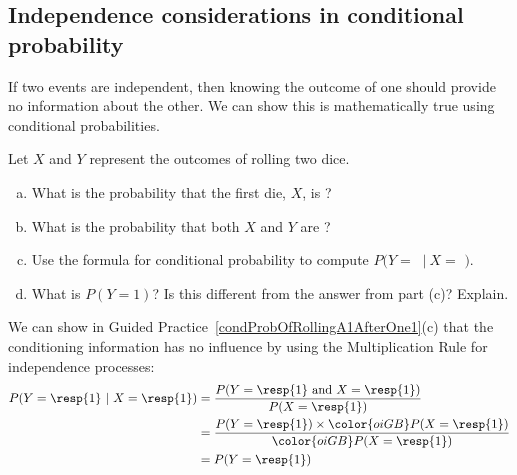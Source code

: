 
\subsection{Independence considerations in conditional probability}

If two events are independent, then knowing the outcome of one should provide no information about the other. We can show this is mathematically true using conditional probabilities.

\begin{exercisewrap}
\begin{nexercise} \label{condProbOfRollingA1AfterOne1}
Let $X$ and $Y$ represent the outcomes of rolling two dice.\footnotemark
\begin{enumerate}[(a)]
\setlength{\itemsep}{0mm}
\item What is the probability that the first die, $X$, is ?
\item What is the probability that both $X$ and $Y$ are ?
\item Use the formula for conditional probability to compute $P(Y =$ $\ |\ X = $ $)$.
\item What is $P(Y=1)$? Is this different from the answer from part (c)? Explain.
\end{enumerate}
\end{nexercise}
\end{exercisewrap}

We can show in Guided Practice~\ref{condProbOfRollingA1AfterOne1}(c) that the conditioning information has no influence by using the Multiplication Rule for independence processes:
\begin{align*}
P(Y=\text{\resp{1}}\ |\ X=\text{\resp{1}})
    &= \frac{P(Y=\text{\resp{1} and }X=\text{\resp{1}})}
      {P(X=\text{\resp{1}})} \\
    &= \frac{P(Y=\text{\resp{1}}) \times
        \color{oiGB}P(X=\text{\resp{1}})}
      {\color{oiGB}P(X=\text{\resp{1}})} \\
    &= P(Y=\text{\resp{1}}) \\
\end{align*}

